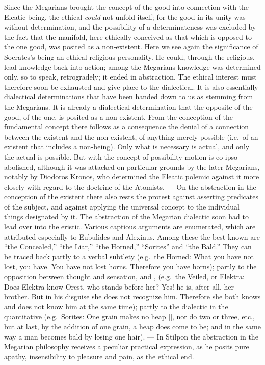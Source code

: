 Since the Megarians brought the concept of the good into connection with the Eleatic being, the ethical \emph{could} not unfold itself; for the good in its unity was without determination, and the possibility of a determinateness was excluded by the fact that the manifold, here ethically conceived as that which is opposed to the one good, was posited as a non-existent. Here we see again the significance of Socrates's being an ethical-religious personality. He could, through the religious, lead knowledge back into action; among the Megarians knowledge was determined only, so to speak, retrogradely; it
ended in abstraction. The ethical interest must therefore soon be exhausted and give place to the dialectical. It is also essentially dialectical determinations that have been handed down to us as stemming from the Megarians. It is already a dialectical determination that the opposite of the good, of the one, is posited as a non-existent. From the conception of the fundamental concept there follows as a consequence the denial of a connection between the existent and the non-existent, of anything merely possible (i.e.\ of an existent that includes a non-being). Only what is necessary is actual, and only the actual is possible. But with the concept of possibility motion is eo ipso abolished, although it was attacked on particular grounds by the later Megarians, notably by Diodoros Kronos, who determined the Eleatic polemic against it more closely with regard to the doctrine of the Atomists. --- On the abstraction in the conception of the existent there also rests the protest against asserting predicates of the subject, and against applying the universal concept to the individual things designated by it. The abstraction of the Megarian dialectic soon had to lead over into the eristic. Various captious arguments are enumerated, which are attributed especially to Eubulides and Alexinus. Among these the best known are ``the Concealed,'' ``the Liar,'' ``the Horned,'' ``Sorites'' and ``the Bald.'' They can be traced back partly to a verbal subtlety (e.g.\ the Horned: What you have not lost, you have. You have not lost horns. Therefore you have horns); partly to the opposition between thought and sensation,  and , (e.g.\ the Veiled, or Elektra: Does Elektra know Orest, who stands before her? Yes! he is, after all, her brother. But in his disguise she does not recognize him. Therefore she both knows and does not know him at the same time); partly to the dialectic in the quantitative (e.g.\ Sorites: One grain makes no heap [], nor do two or three, etc., but at last, by the addition of one grain, a heap does come to be; and in the same way a man becomes bald by losing one hair). --- In Stilpon the abstraction in the Megarian philosophy receives a peculiar practical expression, as he posits pure apathy, insensibility to pleasure and pain, as the ethical end.

